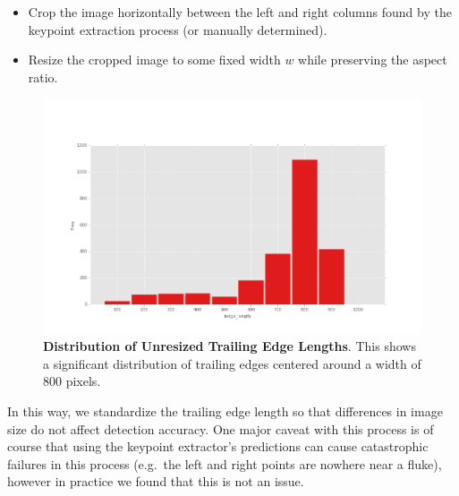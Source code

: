 \begin{itemize}
    \item Crop the image horizontally between the left and right columns found by the keypoint extraction process (or manually determined).
    \item Resize the cropped image to some fixed width $w$ while preserving the aspect ratio.%
\end{itemize}

\begin{figure}[t]%
\centering
\includegraphics[width=1\textwidth]{../images/results/te_size_hist_fb.png}
\caption{\textbf{Distribution of Unresized Trailing Edge Lengths}. This shows a significant distribution of trailing edges centered around a width of 800 pixels.}
\label{fig:width_te_dist}
\end{figure}

In this way, we standardize the trailing edge length so that differences in image size do not affect detection accuracy.
One major caveat with this process is of course that using the keypoint extractor's predictions can cause catastrophic failures in this process (e.g.\ the left and right points are nowhere near a fluke), however in practice we found that this is not an issue.



